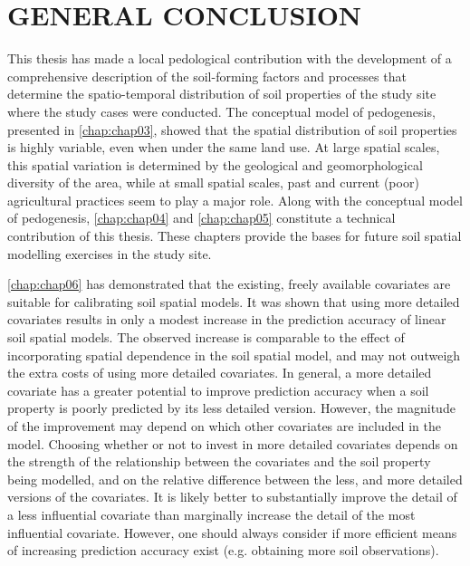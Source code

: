 \artigofalse
\chapter{GENERAL CONCLUSION}
\label{chap:chap10}

This thesis has made a local pedological contribution with the development of a comprehensive description of 
the soil-forming factors and processes that determine the spatio-temporal distribution of soil properties of 
the study site where the study cases were conducted. The conceptual model of pedogenesis, presented in 
\autoref{chap:chap03}, showed that the spatial distribution of soil properties is highly variable, even when 
under the same land use. At large spatial scales, this spatial variation is determined by the geological and 
geomorphological diversity of the area, while at small spatial scales, past and current (poor) agricultural 
practices seem to play a major role. Along with the conceptual model of pedogenesis, \autoref{chap:chap04} and 
\autoref{chap:chap05} constitute a technical contribution of this thesis. These chapters provide the bases for 
future soil spatial modelling exercises in the study site.

\autoref{chap:chap06} has demonstrated that the existing, freely available covariates are suitable for 
calibrating soil spatial models. It was shown that using more detailed covariates results in only a modest 
increase in the prediction accuracy of linear soil spatial models. The observed increase is comparable to the 
effect of incorporating spatial dependence in the soil spatial model, and may not outweigh the extra costs of 
using more detailed covariates. In general, a more detailed covariate has a greater potential to improve 
prediction accuracy when a soil property is poorly predicted by its less detailed version. However, the 
magnitude of the improvement may depend on which other covariates are included in the model. Choosing whether 
or not to invest in more detailed covariates depends on the strength of the relationship between the 
covariates and the soil property being modelled, and on the relative difference between the less, and 
more detailed versions of the covariates. It is likely better to substantially improve the detail of a 
less influential covariate than marginally increase the detail of the most influential covariate. However, one 
should always consider if more efficient means of increasing prediction accuracy exist (e.g. obtaining more 
soil observations).

